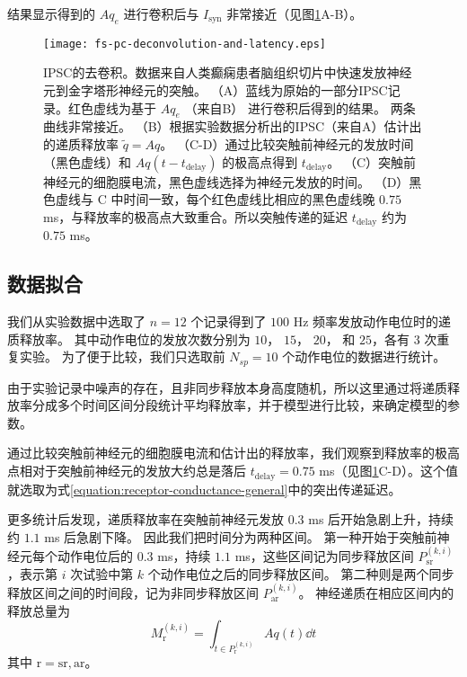 结果显示得到的 $Aq_e$ 进行卷积后与 $I_\text{syn}$ 非常接近（见图\ref{figure:deconvolution-and-latency}A-B）。
\begin{figure}
\centering
\texttt{[image: fs-pc-deconvolution-and-latency.eps]}
\caption{IPSC的去卷积。数据来自人类癫痫患者脑组织切片中快速发放神经元到金字塔形神经元的突触。
（A）蓝线为原始的一部分IPSC记录。红色虚线为基于 $Aq_e$ （来自B） 进行卷积后得到的结果。
两条曲线非常接近。
（B）根据实验数据分析出的IPSC（来自A）估计出的递质释放率 $\tilde{q} = Aq$。
（C-D）通过比较突触前神经元的发放时间（黑色虚线）和 $Aq(t-t_\text{delay})$ 的极高点得到 $t_\text{delay}$。
（C）突触前神经元的细胞膜电流，黑色虚线选择为神经元发放的时间。
（D）黑色虚线与 C 中时间一致，每个红色虚线比相应的黑色虚线晚 $0.75$ ms，与释放率的极高点大致重合。所以突触传递的延迟 $t_\text{delay}$ 约为 $0.75$ ms。
}
\label{figure:deconvolution-and-latency}
\end{figure}

\subsection{数据拟合}
\label{section:methods:data-fitting}
我们从实验数据中选取了 $n = 12$ 个记录得到了 $100$ Hz 频率发放动作电位时的递质释放率。
其中动作电位的发放次数分别为 $10$， $15$， $20$， 和 $25$，各有 $3$ 次重复实验。
为了便于比较，我们只选取前 $N_{sp} = 10$ 个动作电位的数据进行统计。

由于实验记录中噪声的存在，且非同步释放本身高度随机，所以这里通过将递质释放率分成多个时间区间分段统计平均释放率，并于模型进行比较，来确定模型的参数。

通过比较突触前神经元的细胞膜电流和估计出的释放率，我们观察到释放率的极高点相对于突触前神经元的发放大约总是落后 $t_\text{delay} = 0.75$ ms（见图\ref{figure:deconvolution-and-latency}C-D）。这个值就选取为式\ref{equation:receptor-conductance-general}中的突出传递延迟。

更多统计后发现，递质释放率在突触前神经元发放 $0.3$ ms 后开始急剧上升，持续约 $1.1$ ms 后急剧下降。
因此我们把时间分为两种区间。
第一种开始于突触前神经元每个动作电位后的 $0.3$ ms，持续 $1.1$ ms，这些区间记为同步释放区间 $P_\text{sr}^{(k,i)}$ ，表示第 $i$ 次试验中第 $k$ 个动作电位之后的同步释放区间。
第二种则是两个同步释放区间之间的时间段，记为非同步释放区间 $P_\text{ar}^{(k,i)}$。
神经递质在相应区间内的释放总量为
\begin{equation}
M_\text{r}^{(k,i)} = \int_{t \in P_\text{r}^{(k,i)}} Aq(t)\dd{t}
\end{equation}
其中 $\text{r} = \text{sr}, \text{ar}$。

